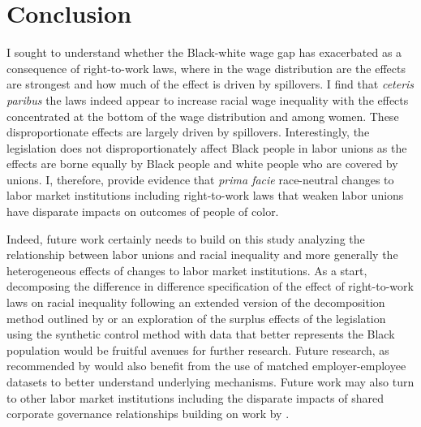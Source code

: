 \documentclass[11pt]{article}
\begin{document}
\section{Conclusion}\label{sec:conc}
I sought to understand whether the Black-white wage gap has exacerbated as a consequence of right-to-work laws, where in the wage distribution are the effects are strongest and how much of the effect is driven by spillovers. I find that \textit{ceteris paribus} the laws indeed appear to increase racial wage inequality with the effects concentrated at the bottom of the wage distribution and among women. These disproportionate effects are largely driven by spillovers. Interestingly, the legislation does not disproportionately affect Black people in labor unions as the effects are borne equally by Black people and white people who are covered by unions. I, therefore, provide evidence that \textit{prima facie} race-neutral changes to labor market institutions including right-to-work laws that weaken labor unions have disparate impacts on outcomes of people of color.  

Indeed, future work certainly needs to build on this study analyzing the relationship between labor unions and racial inequality and more generally the heterogeneous effects of changes to labor market institutions. As a start, decomposing the difference in difference specification of the effect of right-to-work laws on racial inequality following an extended version of the decomposition method outlined by \citet{goodmanbacon2018} or an exploration of the surplus effects of the legislation using the synthetic control method with data that better represents the Black population would be fruitful avenues for further research. Future research, as recommended by \citet{fll2021} would also benefit from the use of matched employer-employee datasets to better understand underlying mechanisms. Future work may also turn to other labor market institutions including the disparate impacts of shared corporate governance relationships building on work by \citet{jsh2020}.
\end{document}
